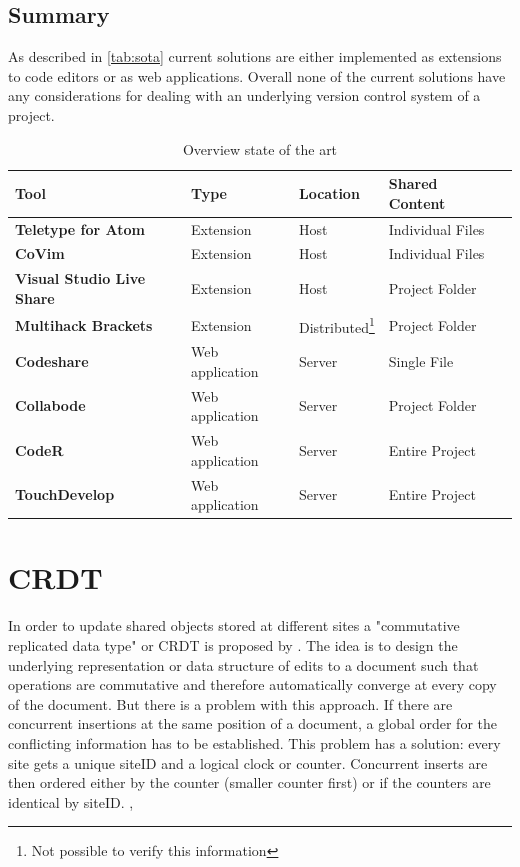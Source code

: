 \newpage
\subsection{Summary}
As described in \autoref{tab:sota} current solutions are either implemented as extensions to code editors or as web applications. Overall none of the current solutions have any considerations for dealing with an underlying version control system of a project.
\begin{table}
	\begin{minipage}{6cm}
		\begin{tabular}{| >{\bfseries}l | l | l | l | l | }
			\hline
				\rowcolor{orange} \bfseries Tool & \bfseries Type & \bfseries Location & \bfseries Shared Content \\
			\hline
			\hline
				Teletype for Atom & Extension & Host & Individual Files \\\hline
				CoVim & Extension & Host & Individual Files \\\hline
				Visual Studio Live Share & Extension & Host & Project Folder \\\hline
				Multihack Brackets & Extension &  Distributed\footnote{Not possible to verify this information} & Project Folder \\\hline
				Codeshare & Web application & Server & Single File \\\hline
				Collabode & Web application & Server & Project Folder \\\hline
				CodeR & Web application & Server & Entire Project \\\hline
				TouchDevelop & Web application & Server & Entire Project \\
			\hline
		\end{tabular}
	\end{minipage}
		\caption{Overview state of the art}
		\label{tab:sota}
	\end{table}

\section{CRDT}
In order to update shared objects stored at different sites a "commutative replicated data type" or CRDT is proposed by \cite{PreguicaMarquesShapiroLetia:2009}. The idea is to design the underlying representation or data structure of edits to a document such that operations are commutative and therefore automatically converge at every copy of the document.
But there is a problem with this approach. If there are concurrent insertions at the same position of a document, a global order for the conflicting information has to be established. This problem has a solution: every site gets a unique siteID and a logical clock or counter. Concurrent inserts are then ordered either by the counter (smaller counter first) or if the counters are identical by siteID. \cite{PreguicaMarquesShapiroLetia:2009}, \cite{Oster:2006:DataconsistencyforP2Pcollaborativeediting}

